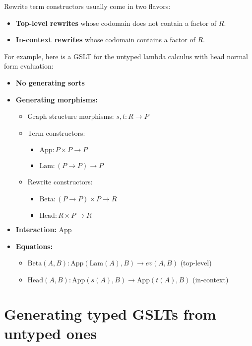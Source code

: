 \documentclass{article}
\begin{document}
Rewrite term constructors usually come in two flavors:

\begin{itemize}
    \item \textbf{Top-level rewrites} whose codomain does not contain a factor of $R$.
    \item \textbf{In-context rewrites} whose codomain contains a factor of $R$.
\end{itemize}

For example, here is a GSLT for the untyped lambda calculus with head normal form evaluation:

\begin{itemize}
    \item \textbf{No generating sorts}
    \item \textbf{Generating morphisms:}
    \begin{itemize}
        \item Graph structure morphisms: $s, t : R \to P$
        \item Term constructors: 
        \begin{itemize}
            \item $\text{App} : P \times P \to P$
            \item $\text{Lam} : (P \to P) \to P$
        \end{itemize}
        \item Rewrite constructors:
        \begin{itemize}
            \item $\text{Beta} : (P \to P) \times P \to R$
            \item $\text{Head} : R \times P \to R$
        \end{itemize}
    \end{itemize}
    \item \textbf{Interaction:} $\text{App}$
    \item \textbf{Equations:}
    \begin{itemize}
        \item $\text{Beta}(A, B) : \text{App}(\text{Lam}(A), B) \to ev(A, B)$ (top-level)
        \item $\text{Head}(A, B) : \text{App}(s(A), B) \to \text{App}(t(A), B)$ (in-context)
    \end{itemize}
\end{itemize}

\section{Generating typed GSLTs from untyped ones}
\end{document}
